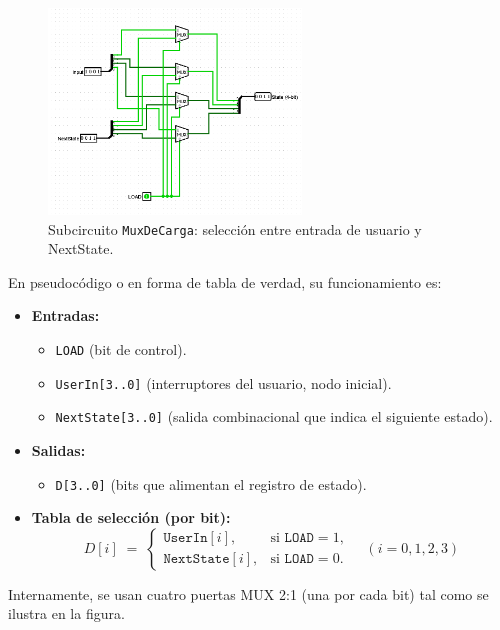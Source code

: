 \documentclass[12pt]{article}
\begin{document}
\begin{figure}[H]
  \centering
  \includegraphics[width=0.6\textwidth]{.github/muxdecarga.png}
  \caption{Subcircuito \texttt{MuxDeCarga}: selección entre entrada de usuario y NextState.}
  \label{fig:muxdecarga}
\end{figure}

En pseudocódigo o en forma de tabla de verdad, su funcionamiento es:
\begin{itemize}
  \item \textbf{Entradas:} 
    \begin{itemize}
      \item \texttt{LOAD} (bit de control).
      \item \texttt{UserIn[3..0]} (interruptores del usuario, nodo inicial).
      \item \texttt{NextState[3..0]} (salida combinacional que indica el siguiente estado).
    \end{itemize}
  \item \textbf{Salidas:} 
    \begin{itemize}
      \item \texttt{D[3..0]} (bits que alimentan el registro de estado).
    \end{itemize}
  \item \textbf{Tabla de selección (por bit):}
    \[
      D[i] \;=\;
      \begin{cases}
        \texttt{UserIn}[i], & \text{si } \texttt{LOAD} = 1,\\
        \texttt{NextState}[i], & \text{si } \texttt{LOAD} = 0.
      \end{cases}
      \quad (i = 0,1,2,3)
    \]
\end{itemize}

Internamente, se usan cuatro puertas MUX 2:1 (una por cada bit) tal como se ilustra en la figura.
\end{document}
